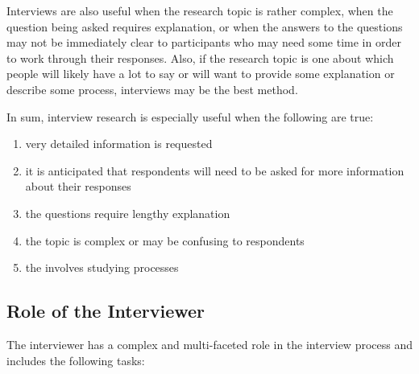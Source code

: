 Interviews are also useful when the research topic is rather complex, when the question being asked requires explanation, or when the answers to the questions may not be immediately clear to participants who may need some time in order to work through their responses. Also, if the research topic is one about which people will likely have a lot to say or will want to provide some explanation or describe some process, interviews may be the best method. 

In sum, interview research is especially useful when the following are true:

\begin{enumerate}
	\item very detailed information is requested
	\item it is anticipated that respondents will need to be asked for more information about their responses
	\item the questions require lengthy explanation
	\item the topic is complex or may be confusing to respondents
	\item the involves studying processes
\end{enumerate}

\subsection{Role of the Interviewer}

The interviewer has a complex and multi-faceted role in the interview process and includes the following tasks:

